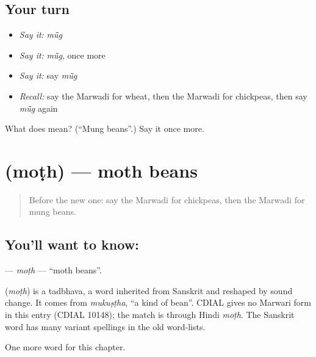 \subsection*{Your turn}
\begin{itemize}
\raggedright
  \item \emph{Say it:} \emph{mū̃g}
  \item \emph{Say it:} \emph{mū̃g}, once more
  \item \emph{Say it:} say \emph{mū̃g}
  \item \emph{Recall:} say the Marwadi for wheat, then the Marwadi for chickpeas, then say \emph{mū̃g} again
\end{itemize}

\begin{tcolorbox}[breakable,colback=teal!4,colframe=teal!35!black,title={Before you move on}]
What does  mean? (\textquotedblleft{}Mung beans\textquotedblright{}.) Say it once more.
\end{tcolorbox}
\section[\texorpdfstring{\mw{मोठ} (moṭh)}{मोठ (moṭh)}]{ (moṭh) — moth beans}

\label{lesson:MW-C133-moth}



\begin{quote}
Before the new one: say the Marwadi for chickpeas, then the Marwadi for mung beans.
\end{quote}

\subsection*{You'll want to know: }
\textbf{} — \emph{moṭh} — \textquotedblleft{}moth beans\textquotedblright{}.

\begin{cousinweb}
\textbf{} (\emph{moṭh}) is a tadbhava, a word inherited from Sanskrit and reshaped by sound change. It comes from \emph{mukuṣṭha}, \textquotedblleft{}a kind of bean\textquotedblright{}. CDIAL gives no Marwari form in this entry (CDIAL 10148); the match is through Hindi \emph{moṭh}. The Sanskrit word has many variant spellings in the old word-lists.
\end{cousinweb}

\begin{grammarlens}[title={What you've built}]
One more word for this chapter.
\end{grammarlens}

